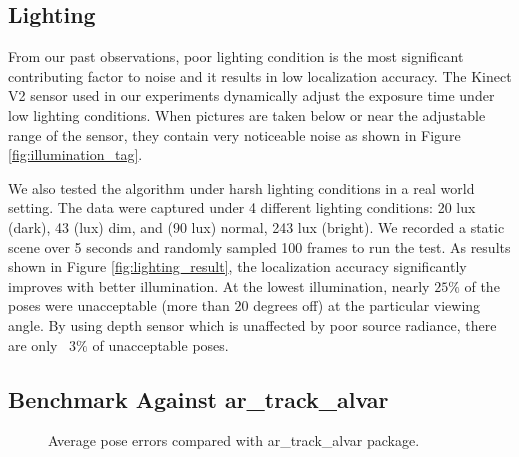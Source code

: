 \subsection{Lighting}

From our past observations, poor lighting condition is the most significant contributing factor to noise and it results in low localization accuracy. The Kinect V2 sensor used in our experiments dynamically adjust the exposure time under low lighting conditions. When pictures are taken below or near the adjustable range of the sensor, they contain very noticeable noise as shown in Figure \ref{fig:illumination_tag}.

We also tested the algorithm under harsh lighting conditions in a real world setting. The data were captured under 4 different lighting conditions: 20 lux (dark), 43 (lux) dim, and (90 lux) normal, 243 lux (bright). We recorded a static scene over 5 seconds and randomly sampled 100 frames to run the test.  As results shown in Figure \ref{fig:lighting_result}, the localization accuracy significantly improves with better illumination. At the lowest illumination, nearly $25\%$ of the poses were unacceptable (more than $20$ degrees off) at the particular viewing angle. By using depth sensor which is unaffected by poor source radiance, there are only ~$3\%$ of unacceptable poses.

\subsection{Benchmark Against ar\_track\_alvar}

\begin{figure}
\centering
{}
\caption{Average pose errors compared with ar\_track\_alvar package.}
\label{fig:alvartrack}
\end{figure}

